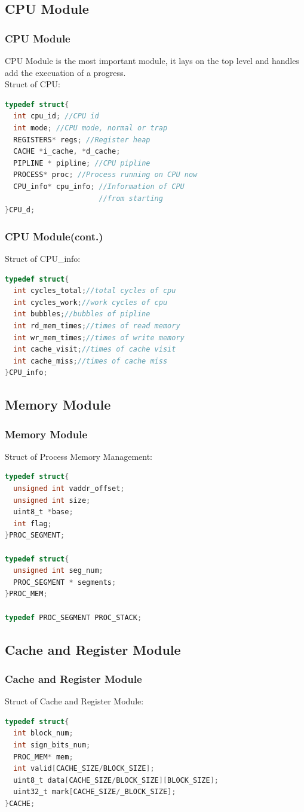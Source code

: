 \documentclass[CJK]{beamer}
\begin{document}
\begin{CJK}{UTF8}{gbsn}
\subsection{CPU Module}
\begin{frame}[fragile]
  \frametitle{CPU Module}
  CPU Module is the most important module, it lays on the top level and handles add the execuation of a progress.\\
  Struct of CPU:
\begin{lstlisting}[language={C}]
typedef struct{
  int cpu_id; //CPU id
  int mode; //CPU mode, normal or trap
  REGISTERS* regs; //Register heap
  CACHE *i_cache, *d_cache;
  PIPLINE * pipline; //CPU pipline
  PROCESS* proc; //Process running on CPU now
  CPU_info* cpu_info; //Information of CPU
                      //from starting
}CPU_d;
\end{lstlisting}
\end{frame}

\begin{frame}[fragile]
  \frametitle{CPU Module(cont.)}
  Struct of CPU\_info:
\begin{lstlisting}[language={C}]
typedef struct{
  int cycles_total;//total cycles of cpu
  int cycles_work;//work cycles of cpu
  int bubbles;//bubbles of pipline
  int rd_mem_times;//times of read memory
  int wr_mem_times;//times of write memory
  int cache_visit;//times of cache visit
  int cache_miss;//times of cache miss
}CPU_info;
\end{lstlisting}
\end{frame}

\subsection{Memory Module}
\begin{frame}[fragile]
  \frametitle{Memory Module}
  Struct of Process Memory Management:
\begin{lstlisting}[language={C}]
typedef struct{
  unsigned int vaddr_offset;
  unsigned int size;
  uint8_t *base;
  int flag;
}PROC_SEGMENT;

typedef struct{
  unsigned int seg_num;
  PROC_SEGMENT * segments;
}PROC_MEM;

typedef PROC_SEGMENT PROC_STACK;
\end{lstlisting}
\end{frame}

\subsection{Cache and Register Module}
\begin{frame}[fragile]
  \frametitle{Cache and Register Module}
  Struct of Cache and Register Module:
\begin{lstlisting}[language={C}]
typedef struct{
  int block_num;
  int sign_bits_num;
  PROC_MEM* mem;
  int valid[CACHE_SIZE/BLOCK_SIZE];
  uint8_t data[CACHE_SIZE/BLOCK_SIZE][BLOCK_SIZE];
  uint32_t mark[CACHE_SIZE/_BLOCK_SIZE];
}CACHE;


\end{lstlisting}
\end{frame}
\end{CJK}
\end{document}
